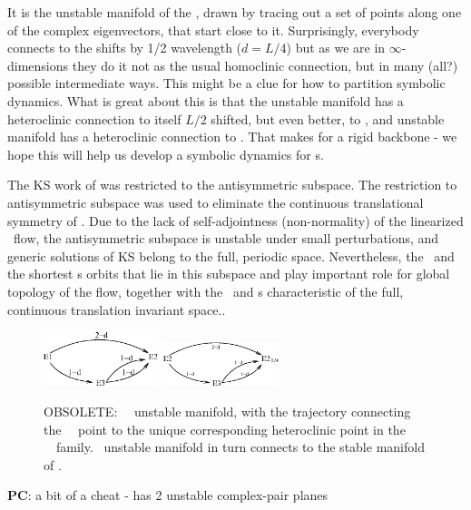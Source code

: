  It is the unstable manifold of the 
{\eqv}, drawn by tracing out a set of points along one of the complex
eigenvectors, that start close to it. Surprisingly, everybody connects
to the  shifts by 1/2 wavelength ($d = L/4$) but as we are in
$\infty$-dimensions they do it not as the usual homoclinic connection, but in
many (all?) possible intermediate ways. This might be a clue for how to
partition symbolic dynamics.
What is great about
this is that the  unstable manifold has a heteroclinic connection to itself
$L/2$ shifted, but
even better, to , and  unstable manifold has a heteroclinic
connection to .
That makes for a rigid backbone -
we hope this will help us develop a symbolic dynamics for \rpo s.

The KS work
of 
was restricted to the antisymmetric subspace.
The restriction to antisymmetric subspace was used
to eliminate the continuous translational symmetry of \KSe.
Due to the lack of self-adjointness
(non-normality) of the linearized \KS\ flow,
the antisymmetric subspace
is unstable under small perturbations, and generic solutions of
KS belong to the full, periodic space.
Nevertheless,
the \eqva\ and the shortest \po s orbits that lie in this subspace
and play important role for global topology of the flow,
together
with the \reqva\ and \rpo s
characteristic of the full, continuous translation invariant space..

\begin{figure} [t]
\begin{center}
\includegraphics[width=0.3\textwidth]{figs/ks22_E1_UM_diag.eps}
\includegraphics[width=0.3\textwidth]{figs/ks22_E2_UM_diag.eps}
\end{center}
\caption{OBSOLETE:
~\eqv\ unstable manifold,
    with the trajectory connecting the
~\eqv\ point to the unique corresponding heteroclinic
point in the ~\eqv\ family.
~unstable manifold in turn connects  to the
stable manifold of .
        }
\label{f:KS22cage}
\end{figure}
{\bf PC}: a bit of a cheat -  has
    2 unstable complex-pair planes

